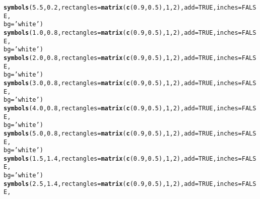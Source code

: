 \documentclass[12pt]{article}\usepackage[]{graphicx}\usepackage[]{color}
\makeatletter
\newcommand{\hlnum}[1]{\textcolor[rgb]{0.686,0.059,0.569}{#1}}%
\newcommand{\hlstr}[1]{\textcolor[rgb]{0.192,0.494,0.8}{#1}}%
\newcommand{\hlstd}[1]{\textcolor[rgb]{0.345,0.345,0.345}{#1}}%
\newcommand{\hlkwc}[1]{\textcolor[rgb]{0.333,0.667,0.333}{#1}}%
\newcommand{\hlkwd}[1]{\textcolor[rgb]{0.737,0.353,0.396}{\textbf{#1}}}%
\newenvironment{kframe}{%
 \def\at@end@of@kframe{}%
 \ifinner\ifhmode%
  \def\at@end@of@kframe{\end{minipage}}%
  \begin{minipage}{\columnwidth}%
 \fi\fi%
 \def\FrameCommand##1{\hskip\@totalleftmargin \hskip-\fboxsep
 \colorbox{shadecolor}{##1}\hskip-\fboxsep
     \hskip-\linewidth \hskip-\@totalleftmargin \hskip\columnwidth}%
 \MakeFramed {\advance\hsize-\width
   \@totalleftmargin\z@ \linewidth\hsize
   \@setminipage}}%
 {\par\unskip\endMakeFramed%
 \at@end@of@kframe}
\newenvironment{knitrout}{}{} %
\makeatother
\begin{document}
\begin{knitrout}
\begin{kframe}
\begin{alltt}
  \hlkwd{symbols}\hlstd{(}\hlnum{5.5}\hlstd{,} \hlnum{0.2}\hlstd{,} \hlkwc{rectangles} \hlstd{=} \hlkwd{matrix}\hlstd{(}\hlkwd{c}\hlstd{(}\hlnum{0.9}\hlstd{,} \hlnum{0.5}\hlstd{),} \hlnum{1}\hlstd{,} \hlnum{2}\hlstd{),} \hlkwc{add} \hlstd{=} \hlnum{TRUE}\hlstd{,} \hlkwc{inches} \hlstd{=} \hlnum{FALSE}\hlstd{,}
          \hlkwc{bg} \hlstd{=} \hlstr{'white'}\hlstd{)}
  \hlkwd{symbols}\hlstd{(}\hlnum{1.0}\hlstd{,} \hlnum{0.8}\hlstd{,} \hlkwc{rectangles} \hlstd{=} \hlkwd{matrix}\hlstd{(}\hlkwd{c}\hlstd{(}\hlnum{0.9}\hlstd{,} \hlnum{0.5}\hlstd{),} \hlnum{1}\hlstd{,} \hlnum{2}\hlstd{),} \hlkwc{add} \hlstd{=} \hlnum{TRUE}\hlstd{,} \hlkwc{inches} \hlstd{=} \hlnum{FALSE}\hlstd{,}
          \hlkwc{bg} \hlstd{=} \hlstr{'white'}\hlstd{)}
  \hlkwd{symbols}\hlstd{(}\hlnum{2.0}\hlstd{,} \hlnum{0.8}\hlstd{,} \hlkwc{rectangles} \hlstd{=} \hlkwd{matrix}\hlstd{(}\hlkwd{c}\hlstd{(}\hlnum{0.9}\hlstd{,} \hlnum{0.5}\hlstd{),} \hlnum{1}\hlstd{,} \hlnum{2}\hlstd{),} \hlkwc{add} \hlstd{=} \hlnum{TRUE}\hlstd{,} \hlkwc{inches} \hlstd{=} \hlnum{FALSE}\hlstd{,}
          \hlkwc{bg} \hlstd{=} \hlstr{'white'}\hlstd{)}
  \hlkwd{symbols}\hlstd{(}\hlnum{3.0}\hlstd{,} \hlnum{0.8}\hlstd{,} \hlkwc{rectangles} \hlstd{=} \hlkwd{matrix}\hlstd{(}\hlkwd{c}\hlstd{(}\hlnum{0.9}\hlstd{,} \hlnum{0.5}\hlstd{),} \hlnum{1}\hlstd{,} \hlnum{2}\hlstd{),} \hlkwc{add} \hlstd{=} \hlnum{TRUE}\hlstd{,} \hlkwc{inches} \hlstd{=} \hlnum{FALSE}\hlstd{,}
          \hlkwc{bg} \hlstd{=} \hlstr{'white'}\hlstd{)}
  \hlkwd{symbols}\hlstd{(}\hlnum{4.0}\hlstd{,} \hlnum{0.8}\hlstd{,} \hlkwc{rectangles} \hlstd{=} \hlkwd{matrix}\hlstd{(}\hlkwd{c}\hlstd{(}\hlnum{0.9}\hlstd{,} \hlnum{0.5}\hlstd{),} \hlnum{1}\hlstd{,} \hlnum{2}\hlstd{),} \hlkwc{add} \hlstd{=} \hlnum{TRUE}\hlstd{,} \hlkwc{inches} \hlstd{=} \hlnum{FALSE}\hlstd{,}
          \hlkwc{bg} \hlstd{=} \hlstr{'white'}\hlstd{)}
  \hlkwd{symbols}\hlstd{(}\hlnum{5.0}\hlstd{,} \hlnum{0.8}\hlstd{,} \hlkwc{rectangles} \hlstd{=} \hlkwd{matrix}\hlstd{(}\hlkwd{c}\hlstd{(}\hlnum{0.9}\hlstd{,} \hlnum{0.5}\hlstd{),} \hlnum{1}\hlstd{,} \hlnum{2}\hlstd{),} \hlkwc{add} \hlstd{=} \hlnum{TRUE}\hlstd{,} \hlkwc{inches} \hlstd{=} \hlnum{FALSE}\hlstd{,}
          \hlkwc{bg} \hlstd{=} \hlstr{'white'}\hlstd{)}
  \hlkwd{symbols}\hlstd{(}\hlnum{1.5}\hlstd{,} \hlnum{1.4}\hlstd{,} \hlkwc{rectangles} \hlstd{=} \hlkwd{matrix}\hlstd{(}\hlkwd{c}\hlstd{(}\hlnum{0.9}\hlstd{,} \hlnum{0.5}\hlstd{),} \hlnum{1}\hlstd{,} \hlnum{2}\hlstd{),} \hlkwc{add} \hlstd{=} \hlnum{TRUE}\hlstd{,} \hlkwc{inches} \hlstd{=} \hlnum{FALSE}\hlstd{,}
          \hlkwc{bg} \hlstd{=} \hlstr{'white'}\hlstd{)}
  \hlkwd{symbols}\hlstd{(}\hlnum{2.5}\hlstd{,} \hlnum{1.4}\hlstd{,} \hlkwc{rectangles} \hlstd{=} \hlkwd{matrix}\hlstd{(}\hlkwd{c}\hlstd{(}\hlnum{0.9}\hlstd{,} \hlnum{0.5}\hlstd{),} \hlnum{1}\hlstd{,} \hlnum{2}\hlstd{),} \hlkwc{add} \hlstd{=} \hlnum{TRUE}\hlstd{,} \hlkwc{inches} \hlstd{=} \hlnum{FALSE}\hlstd{,}

\end{alltt}
\end{kframe}
\end{knitrout}
\end{document}

